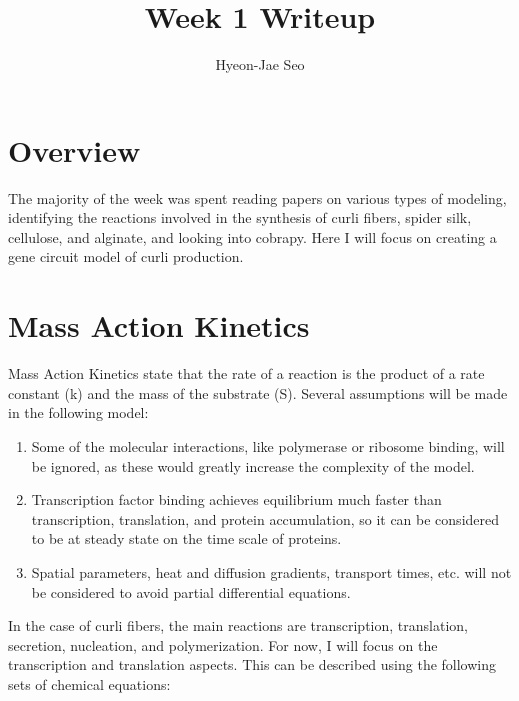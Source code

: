 \documentclass[11pt, oneside]{article}   	%
\title{Week 1 Writeup}
\author{Hyeon-Jae Seo}
\begin{document}
\maketitle

\section{Overview}
The majority of the week was spent reading papers on various types of modeling, identifying the reactions involved in the synthesis of curli fibers, spider silk, cellulose, and alginate, and looking into cobrapy. Here I will focus on creating a gene circuit model of curli production.

\section{Mass Action Kinetics}
Mass Action Kinetics state that the rate of a reaction is the product of a rate constant (k) and the mass of the substrate (S). Several assumptions will be made in the following model:

\begin{enumerate}
	\item Some of the molecular interactions, like polymerase or ribosome binding, will be ignored, as these would greatly increase the complexity of the model.
	\item Transcription factor binding achieves equilibrium much faster than transcription, translation, and protein accumulation, so it can be considered to be at steady state on the time scale of proteins. 
	\item Spatial parameters, heat and diffusion gradients, transport times, etc. will not be considered to avoid partial differential equations.
\end{enumerate}

In the case of curli fibers, the main reactions are transcription, translation, secretion, nucleation, and polymerization. For now, I will focus on the transcription and translation aspects. This can be described using the following sets of chemical equations: 
\end{document}
